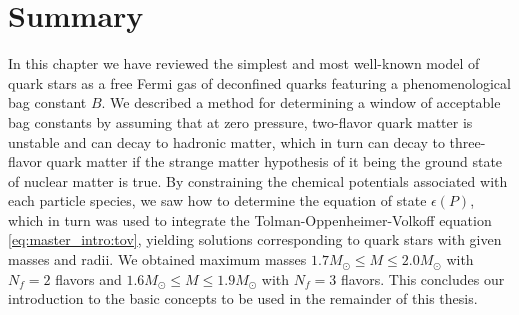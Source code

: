 \section{Summary}

In this chapter we have reviewed the simplest and most well-known model of quark stars
as a free Fermi gas of deconfined quarks featuring a phenomenological bag constant $B$.
We described a method for determining a window of acceptable bag constants by assuming that at zero pressure,
two-flavor quark matter is unstable and can decay to hadronic matter,
which in turn can decay to three-flavor quark matter
if the strange matter hypothesis of it being the ground state of nuclear matter is true.
By constraining the chemical potentials associated with each particle species,
we saw how to determine the equation of state $\epsilon(P)$,
which in turn was used to integrate the Tolman-Oppenheimer-Volkoff equation \eqref{eq:master_intro:tov},
yielding solutions corresponding to quark stars with given masses and radii.
We obtained maximum masses $1.7 M_\odot \leq M \leq 2.0 M_\odot$ with $N_f=2$ flavors
and $1.6 M_\odot \leq M \leq 1.9 M_\odot$ with $N_f=3$ flavors.
This concludes our introduction to the basic concepts to be used in the remainder of this thesis.
